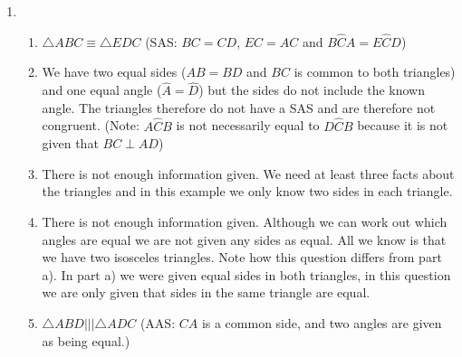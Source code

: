 \begin{solutions}{}
{\begin{enumerate}[itemsep=5pt, label=\textbf{\arabic*}. ]
\begin{enumerate}[noitemsep, label=\textbf{(\alph*)} ]
\item From the theorem of Pythagoras:\\
$x^2 = 15^2 - 9^2\\
x=\sqrt{144}
x=12$ units \\
And\\
$y^2 = x^2+5^2\\
y^2=144+25\\
y=\sqrt{169}\\
y=13$ units
      \end{enumerate}
\item %
      \begin{enumerate}[itemsep=3pt, label=\textbf{(\alph*)} ]
      \item 
$\triangle ABC \equiv \triangle EDC$ (SAS: $BC=CD$, $EC=AC$ and $B\hat{C}A = E\hat{C}D$)
      \item We have two equal sides ($AB = BD$ and $BC$ is common to both triangles) and one equal angle ($\hat{A} = \hat{D}$) but the sides do not include the known angle. The triangles therefore do not have a SAS  and are therefore not congruent. (Note: $A\hat{C}B$ is not necessarily equal to $D\hat{C}B$ because it is not given that $BC \perp AD$)
      \item There is not enough information given. We need at least three facts about the triangles and in this example we only know two sides in each triangle.

 

\item There is not enough information given. Although we can work out which angles are equal we are not given any sides as equal. All we know is that we have two isosceles triangles. Note how this question differs from part a). In part a) we were given equal sides in both triangles, in this question we are only given that sides in the same triangle are equal.
      \item $\triangle ABD ||| \triangle ADC$ (AAS: $CA$ is a common side, and two angles are given as being equal.)
      \end{enumerate}
\end{enumerate}}
\end{solutions}


